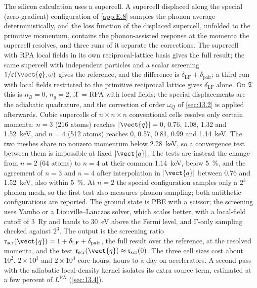The silicon calculation uses a supercell. A supercell displaced along the special (zero-gradient) configuration of \cref{app:E.8} samples the phonon average deterministically, and the loss function of the displaced supercell, unfolded to the primitive momentum, contains the phonon-assisted response at the momenta the supercell resolves, and three runs of it separate the corrections. The supercell with RPA local fields in its own reciprocal-lattice basis gives the full result; the same supercell with independent particles and a scalar screening $1/\varepsilon(\vect{q},\omega)$ gives the reference, and the difference is $\delta_{\mathrm{LF}} + \delta_{\mathrm{pair}}$; a third run with local fields restricted to the primitive reciprocal lattice gives $\delta_{\mathrm{LF}}$ alone. On $\mathfrak{T}$ this is $n_B = 0$, $n_g = 2$, $\mathcal{X}$ = RPA with local fields; the special displacements are the adiabatic quadrature, and the correction of order $\omega_Q$ of \cref{sec:13.2} is applied afterwards. Cubic supercells of $n\times n\times n$ conventional cells resolve only certain momenta: $n = 3$ (216 atoms) reaches $|\vect{q}| = 0$, 0.76, 1.08, 1.32 and \SI{1.52}{keV}, and $n = 4$ (512 atoms) reaches 0, 0.57, 0.81, 0.99 and \SI{1.14}{keV}. The two meshes share no nonzero momentum below \SI{2.28}{keV}, so a convergence test between them is impossible at fixed $|\vect{q}|$. The tests are instead the change from $n = 2$ (64 atoms) to $n = 4$ at their common \SI{1.14}{keV}, below \SI{5}{\percent}, and the agreement of $n = 3$ and $n = 4$ after interpolation in $|\vect{q}|$ between 0.76 and \SI{1.52}{keV}, also within \SI{5}{\percent}. At $n = 2$ the special configuration samples only a $2^3$ phonon mesh, so the first test also measures phonon sampling; both antithetic configurations are reported. The ground state is PBE with a scissor; the screening uses Yambo or a Liouville--Lanczos solver, which scales better, with a local-field cutoff of \SI{3}{Ry} and bands to \SI{30}{eV} above the Fermi level, and $\mathrm{\Gamma}$-only sampling checked against $2^3$. The output is the screening ratio $\mathfrak{r}_{\mathrm{scr}}(\vect{q}) = 1 + \delta_{\mathrm{LF}} + \delta_{\mathrm{pair}}$, the full result over the reference, at the resolved momenta, and the test $\mathfrak{r}_{\mathrm{scr}}(\vect{q}) \approx \mathfrak{r}_{\mathrm{scr}}(0)$. The three cell sizes cost about $10^2$, $2\times10^3$ and $2\times10^4$ core-hours, hours to a day on accelerators. A second pass with the adiabatic local-density kernel isolates its extra source term, estimated at a few percent of $L^{\mathrm{PA}}$ (\cref{sec:13.4}).

